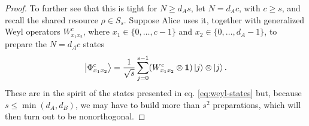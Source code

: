 \begin{proof}
        To further see that this is tight for $N \geq d_A s$, let $N = d_A c$, with $c \geq s$, and recall the shared resource $\rho \in S_s$. Suppose Alice uses it, together with generalized Weyl operators $W_{x_1 x_2}^c$, where $x_1 \in \{ 0, \ldots, c - 1 \}$ and $x_2 \in \{ 0, \ldots, d_A - 1 \}$, to prepare the $N = d_A c$ states
        \begin{equation}
            \ket{\Phi_{x_1 x_2}^c} = \frac{1}{\sqrt{s}} \sum_{j=0}^{s-1} (W_{x_1 x_2}^c \otimes \mathbf{1}) \ket{j} \otimes \ket{j} .
            \label{eq:schmidt-best-states}
        \end{equation}
        These are in the spirit of the states presented in eq. \ref{eq:weyl-states} but, because $s \leq \min(d_A, d_B)$, we may have to build more than $s^2$ preparations, which will then turn out to be nonorthogonal.
        

\end{proof}
